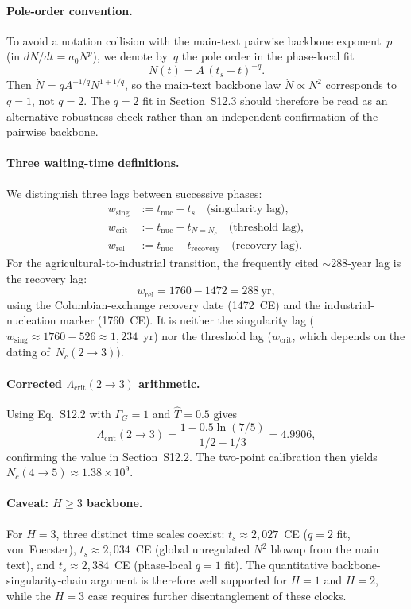\documentclass[11pt]{article}
\begin{document}
\paragraph{Pole-order convention.}
To avoid a notation collision with the main-text pairwise backbone exponent~$p$
(in $dN/dt = a_0 N^p$), we denote by~$q$ the pole order in the
phase-local fit
\[
N(t) = A\,(t_s - t)^{-q}.
\]
Then $\dot N = q A^{-1/q} N^{1+1/q}$, so the main-text backbone law
$\dot N \propto N^2$ corresponds to $q = 1$, not $q = 2$.
The $q = 2$ fit in Section~S12.3 should therefore be read as an alternative
robustness check rather than an independent confirmation of the pairwise backbone.

\paragraph{Three waiting-time definitions.}
We distinguish three lags between successive phases:
\begin{align}
w_{\mathrm{sing}} &:= t_{\mathrm{nuc}} - t_s
  \quad\text{(singularity lag)}, \label{eq:w_sing} \\
w_{\mathrm{crit}} &:= t_{\mathrm{nuc}} - t_{N = N_c}
  \quad\text{(threshold lag)}, \label{eq:w_crit} \\
w_{\mathrm{rel}} &:= t_{\mathrm{nuc}} - t_{\mathrm{recovery}}
  \quad\text{(recovery lag)}. \label{eq:w_rel}
\end{align}
For the agricultural-to-industrial transition, the frequently cited $\sim$288-year
lag is the recovery lag:
\[
w_{\mathrm{rel}} = 1760 - 1472 = 288~\mathrm{yr},
\]
using the Columbian-exchange recovery date (1472~CE) and the industrial-nucleation
marker (1760~CE).  It is neither the singularity lag ($w_{\mathrm{sing}} \approx
1760 - 526 \approx 1{,}234$~yr) nor the threshold lag ($w_{\mathrm{crit}}$, which
depends on the dating of~$N_c(2 \to 3)$).

\paragraph{Corrected $\Lambda_{\mathrm{crit}}(2\!\to\!3)$ arithmetic.}
Using Eq.~S12.2 with $\Gamma_G = 1$ and $\hat{T} = 0.5$ gives
\[
\Lambda_{\mathrm{crit}}(2 \to 3)
= \frac{1 - 0.5\ln(7/5)}{1/2 - 1/3}
= 4.9906,
\]
confirming the value in Section~S12.2.  The two-point calibration then yields
$N_c(4 \to 5) \approx 1.38 \times 10^9$.

\paragraph{Caveat: $H \ge 3$ backbone.}
For $H = 3$, three distinct time scales coexist:
$t_s \approx 2{,}027$~CE ($q = 2$ fit, von~Foerster),
$t_s \approx 2{,}034$~CE (global unregulated $N^2$ blowup from the main text),
and $t_s \approx 2{,}384$~CE (phase-local $q = 1$ fit).
The quantitative backbone-singularity-chain argument is therefore well supported
for $H = 1$ and $H = 2$, while the $H = 3$ case requires further disentanglement
of these clocks.
\end{document}
